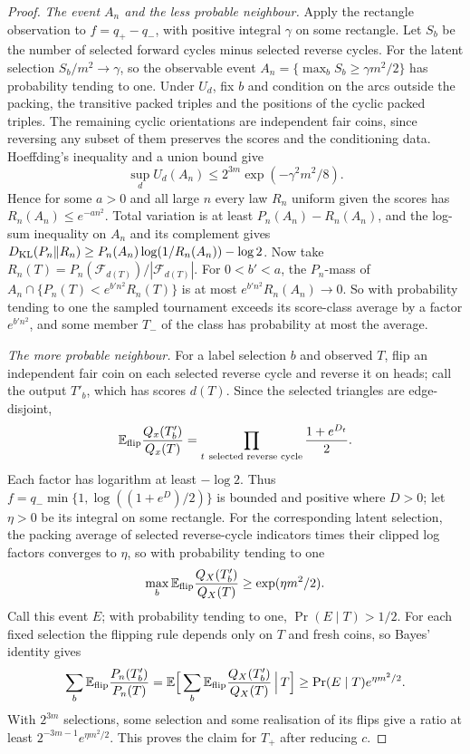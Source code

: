 \documentclass[11pt,a4paper]{article}
\theoremstyle{definition}
\newcommand{\E}{\mathbb E}
\begin{document}
\begin{proof}
\emph{The event $A_n$ and the less probable neighbour.} Apply the rectangle observation to $f=q_+-q_-$, with positive integral $\gamma$ on some rectangle. Let $S_b$ be the number of selected forward cycles minus selected reverse cycles. For the latent selection $S_b/m^2\to\gamma$, so the observable event $A_n=\{\max_b S_b\ge\gamma m^2/2\}$ has probability tending to one. Under $U_d$, fix $b$ and condition on the arcs outside the packing, the transitive packed triples and the positions of the cyclic packed triples. The remaining cyclic orientations are independent fair coins, since reversing any subset of them preserves the scores and the conditioning data. Hoeffding's inequality and a union bound give
\begin{equation}\label{eq:fair-cycle-tail}
 \sup_d U_d(A_n)\le 2^{3m}\exp(-\gamma^2m^2/8).
\end{equation}
Hence for some $a>0$ and all large $n$ every law $R_n$ uniform given the scores has $R_n(A_n)\le e^{-a n^2}$. Total variation is at least $P_n(A_n)-R_n(A_n)$, and the log-sum inequality on $A_n$ and its complement gives $D_{\rm KL}(P_n\Vert R_n)\ge P_n(A_n)\log(1/R_n(A_n))-\log 2$. Now take $R_n(T)=P_n(\mathcal F_{d(T)})/|\mathcal F_{d(T)}|$. For $0<b'<a$, the $P_n$-mass of $A_n\cap\{P_n(T)<e^{b'n^2} R_n(T)\}$ is at most $e^{b'n^2}R_n(A_n)\to0$. So with probability tending to one the sampled tournament exceeds its score-class average by a factor $e^{b'n^2}$, and some member $T_-$ of the class has probability at most the average.

\emph{The more probable neighbour.} For a label selection $b$ and observed $T$, flip an independent fair coin on each selected reverse cycle and reverse it on heads; call the output $T'_b$, which has scores $d(T)$. Since the selected triangles are edge-disjoint,
\[
 \E_{\rm flip}\frac{Q_x(T'_b)}{Q_x(T)}
 =\prod_{t\ \text{selected reverse cycle}}\frac{1+e^{D_t}}2 .
\]
Each factor has logarithm at least $-\log2$. Thus $f=q_-\min\{1,\log((1+e^D)/2)\}$ is bounded and positive where $D>0$; let $\eta>0$ be its integral on some rectangle. For the corresponding latent selection, the packing average of selected reverse-cycle indicators times their clipped log factors converges to $\eta$, so with probability tending to one
\[
 \max_b\E_{\rm flip}\frac{Q_X(T'_b)}{Q_X(T)}\ge\exp(\eta m^2/2).
\]
Call this event $E$; with probability tending to one, $\Pr(E\mid T)>1/2$. For each fixed selection the flipping rule depends only on $T$ and fresh coins, so Bayes' identity gives
\[
 \sum_b\E_{\rm flip}\frac{P_n(T'_b)}{P_n(T)}
 =\E\Big[\sum_b\E_{\rm flip}\frac{Q_X(T'_b)}{Q_X(T)}\,\Big|\,T\Big]
 \ge\Pr(E\mid T)e^{\eta m^2/2}.
\]
With $2^{3m}$ selections, some selection and some realisation of its flips give a ratio at least $2^{-3m-1}e^{\eta m^2/2}$. This proves the claim for $T_+$ after reducing $c$.
\end{proof}
\end{document}

